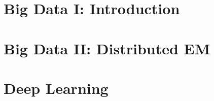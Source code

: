 \documentclass{report}
\begin{document}
%

\chapter{Big Data I: Introduction}


\chapter{Big Data II: Distributed EM}


\chapter{Deep Learning}




% 
% 


%


\end{document}
